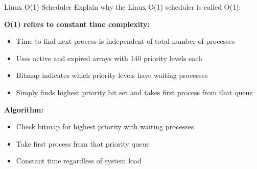 \begin{example2}{Linux O(1) Scheduler}
    Explain why the Linux O(1) scheduler is called O(1):
    
    \textbf{O(1) refers to constant time complexity:}
    \begin{itemize}
        \item Time to find next process is independent of total number of processes
        \item Uses active and expired arrays with 140 priority levels each
        \item Bitmap indicates which priority levels have waiting processes
        \item Simply finds highest priority bit set and takes first process from that queue
    \end{itemize}
    
    \textbf{Algorithm:}
    \begin{itemize}
        \item Check bitmap for highest priority with waiting processes
        \item Take first process from that priority queue
        \item Constant time regardless of system load
    \end{itemize}
\end{example2}



